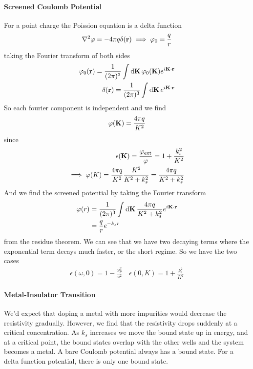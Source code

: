 \documentclass[../main.tex]{subfiles}
\begin{document}
\paragraph*{Screened Coulomb Potential} For a point charge the Poission equation is a delta function
\begin{align*}
    \laplacian \varphi = - 4\pi q \delta(\vb r) \implies \varphi_0 = \frac{q}{r}
\end{align*}
taking the Fourier transform of both sides
\begin{align*}
    \varphi_0(\vb r) = \frac{1}{(2\pi)^3} \int \dd{\vb K} \varphi_0 (\vb K) e^{i\vb K \cdot \vb r} \\
    \delta(\vb r) = \frac{1}{(2\pi)^3} \int \dd{\vb K} e^{i\vb K \cdot \vb r}
\end{align*}
So each fourier component is independent and we find
\begin{align*}
    \varphi(\vb K) = \frac{4\pi q}{K^2}
\end{align*}
since
\begin{align*}
    \epsilon(\vb K) = \frac{\varphi_{\text{ext}}}{\varphi} = 1 + \frac{k_s^2}{K^2} \\
    \implies \varphi(K) = \frac{4\pi q}{K^2} \frac{K^2}{K^2 + k_s^2} = \frac{4\pi q}{K^2 + k_s^2}
\end{align*}
And we find the screened potential by taking the Fourier transform
\begin{align*}
    \varphi(r) &= \frac{1}{(2\pi)^3} \int \dd{\vb K} \frac{4\pi q}{K^2 + k_s^2} e^{i\vb K \cdot \vb r} \\
    &= \frac{q}{r} e^{-k_s r}
\end{align*}
from the residue theorem. We can see that we have two decaying terms where the exponential term 
decays much faster, or the short regime. So we have the two cases
\begin{align*}
    \epsilon(\omega, 0) = 1 - \frac{\omega_p^2}{\omega^2} \quad \epsilon(0, K) = 1 + \frac{k_s^2}{K^2}
\end{align*}
\paragraph*{Metal-Insulator Transition} We'd expect that doping a metal with more impurities would
decrease the resistivity gradually. However, we find that the resistivity drops suddenly at a
critical concentration. As $k_s$ increases we move the bound state up in energy, and at a critical
point, the bound states overlap with the other wells and the system becomes a metal. A bare Coulomb
potential always has a bound state. For a delta function potential, there is only one bound state.
\end{document}
